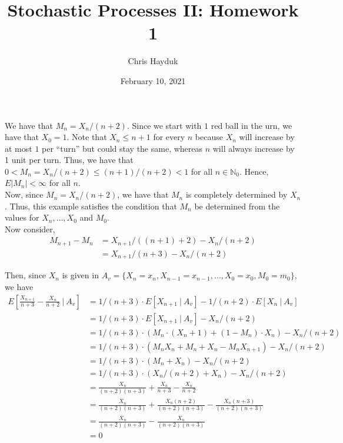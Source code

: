 \documentclass[12pt]{article}
\newenvironment{problem}[2][Problem]{\begin{trivlist}
\item[\hskip \labelsep {\bfseries #1}\hskip \labelsep {\bfseries #2.}]}{\end{trivlist}}
\begin{document}
\title{Stochastic Processes II: Homework 1}

\author{Chris Hayduk}
\date{February 10, 2021}

\maketitle

\begin{problem}{I}
\end{problem}

We have that $M_n = X_n/(n+2)$. Since we start with $1$ red ball in the urn, we have that $X_0 = 1$. Note that $X_n \leq n+1$ for every $n$ because $X_n$ will increase by at most $1$ per ``turn'' but could stay the same, whereas $n$ will always increase by 1 unit per turn. Thus, we have that $0 < M_n = X_n/(n+2) \leq (n+1)/(n+2) < 1$ for all $n \in \mathbb{N}_0$. Hence, $E|M_n| < \infty$ for all $n$.\\

Now, since $M_n = X_n/(n+2)$, we have that $M_n$ is completely determined by $X_n$. Thus, this example satisfies the condition that $M_n$ be determined from the values for $X_n, \ldots, X_0$ and $M_0$.\\

Now consider,
\begin{align*}
M_{n+1} - M_n &= X_{n+1}/((n+1)+2) - X_n/(n+2)\\
&= X_{n+1}/(n+3) - X_n/(n+2)
\end{align*}

Then, since $X_n$ is given in $A_v = \{X_n = x_n, X_{n-1} = x_{n-1},\ldots, X_0 = x_0, M_0 = m_0\}$, we have
\begin{align*}
E\left[\frac{X_{n+1}}{n+3} - \frac{X_n}{n+2} \ | \ A_v\right] &= 1/(n+3)\cdot E[X_{n+1} \ | \ A_v] - 1/(n+2) \cdot E[X_n \ | \ A_v]\\
&= 1/(n+3)\cdot E[X_{n+1} \ | \ A_v] - X_n/(n+2)\\
&= 1/(n+3) \cdot \left(M_n \cdot (X_{n} + 1) + (1 - M_n) \cdot X_{n}\right) - X_n/(n+2)\\
&= 1/(n+3) \cdot \left(M_nX_{n} + M_n + X_{n} - M_nX_{n+1}\right) - X_n/(n+2)\\
&= 1/(n+3) \cdot \left(M_n + X_{n}\right) - X_n/(n+2)\\
&= 1/(n+3) \cdot \left(X_n/(n+2) + X_{n}\right) - X_n/(n+2)\\
&= \frac{X_n}{(n+2)(n+3)} + \frac{X_n}{n+3} - \frac{X_n}{n+2}\\
&= \frac{X_n}{(n+2)(n+3)} + \frac{X_n(n+2)}{(n+2)(n+3)} - \frac{X_n(n+3)}{(n+2)(n+3)}\\
&= \frac{X_n}{(n+2)(n+3)} - \frac{X_n}{(n+2)(n+3)}\\
&= 0
\end{align*}
\end{document}

